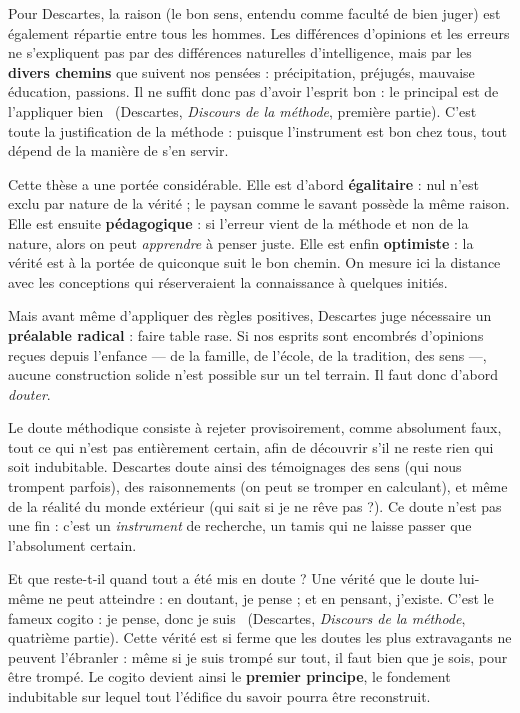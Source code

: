 \documentclass[11pt]{article}
\newcommand{\cle}[1]{{\popxbold\color{popdark}#1}}
\newcounter{popsec}
\newcounter{popsub}
\newcommand{\courssub}[1]{%
  \stepcounter{popsub}%
  \par\vspace{9pt}\noindent{\popxbold\fontsize{11.5}{13}\selectfont\color{popink}{\color{poporange}\thepopsec.\thepopsub}\hspace{6pt}#1}\par\nopagebreak\vspace{4pt}
}
\begin{document}
\begin{propriete}
Pour Descartes, la raison (le \cle{bon sens}, entendu comme faculté de bien juger) est également répartie entre tous les hommes. Les différences d'opinions et les erreurs ne s'expliquent pas par des différences naturelles d'intelligence, mais par les \textbf{divers chemins} que suivent nos pensées : précipitation, préjugés, mauvaise éducation, passions. Il ne suffit donc pas d'avoir l'esprit bon : \guillemotleft le principal est de l'appliquer bien \guillemotright\ (Descartes, \emph{Discours de la méthode}, première partie). C'est toute la justification de la méthode : puisque l'instrument est bon chez tous, tout dépend de la manière de s'en servir.
\end{propriete}

Cette thèse a une portée considérable. Elle est d'abord \textbf{égalitaire} : nul n'est exclu par nature de la vérité ; le paysan comme le savant possède la même raison. Elle est ensuite \textbf{pédagogique} : si l'erreur vient de la méthode et non de la nature, alors on peut \emph{apprendre} à penser juste. Elle est enfin \textbf{optimiste} : la vérité est à la portée de quiconque suit le bon chemin. On mesure ici la distance avec les conceptions qui réserveraient la connaissance à quelques initiés.

\courssub{Le doute méthodique : démolir pour reconstruire}

Mais avant même d'appliquer des règles positives, Descartes juge nécessaire un \textbf{préalable radical} : faire table rase. Si nos esprits sont encombrés d'opinions reçues depuis l'enfance — de la famille, de l'école, de la tradition, des sens —, aucune construction solide n'est possible sur un tel terrain. Il faut donc d'abord \emph{douter}.

Le \cle{doute méthodique} consiste à rejeter provisoirement, comme absolument faux, tout ce qui n'est pas entièrement certain, afin de découvrir s'il ne reste rien qui soit indubitable. Descartes doute ainsi des témoignages des sens (qui nous trompent parfois), des raisonnements (on peut se tromper en calculant), et même de la réalité du monde extérieur (qui sait si je ne rêve pas ?). Ce doute n'est pas une fin : c'est un \emph{instrument} de recherche, un tamis qui ne laisse passer que l'absolument certain.

Et que reste-t-il quand tout a été mis en doute ? Une vérité que le doute lui-même ne peut atteindre : en doutant, je pense ; et en pensant, j'existe. C'est le fameux \cle{cogito} : \guillemotleft je pense, donc je suis \guillemotright\ (Descartes, \emph{Discours de la méthode}, quatrième partie). Cette vérité est si ferme que les doutes les plus extravagants ne peuvent l'ébranler : même si je suis trompé sur tout, il faut bien que je sois, pour être trompé. Le cogito devient ainsi le \textbf{premier principe}, le fondement indubitable sur lequel tout l'édifice du savoir pourra être reconstruit.
\end{document}
